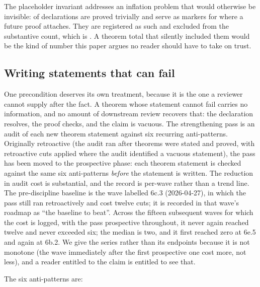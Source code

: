 \documentclass[11pt]{article}
\begin{document}
The placeholder invariant addresses an inflation problem that would
otherwise be invisible: \placeholdertheorems{} of \totaltheorems{}
declarations are proved trivially and serve as markers for where a future
proof attaches. They are registered as such and excluded from the
substantive count, which is \substantivetheorems{}. A theorem total that
silently included them would be the kind of number this paper argues no
reader should have to take on trust.


\subsection{Writing statements that can fail}
\label{sec:strengthening}

One precondition deserves its own treatment, because it is the one a
reviewer cannot supply after the fact. A theorem whose statement cannot
fail carries no information, and no amount of downstream review recovers
that: the declaration resolves, the proof checks, and the claim is
vacuous. The strengthening pass is an audit of each new theorem statement
against six recurring anti-patterns. Originally retroactive (the audit ran after
theorems were stated and proved, with retroactive cuts applied
where the audit identified a vacuous statement), the pass has
been moved to the prospective phase: each theorem statement is
checked against the same six anti-patterns \emph{before} the
statement is written. The reduction in audit cost is substantial, and
the record is per-wave rather than a trend line. The
pre-discipline baseline is the wave labelled 6c.3 (2026-04-27), in
which the pass still ran retroactively and cost twelve cuts; it is
recorded in that wave's roadmap as ``the baseline to beat''. Across
the fifteen subsequent waves for which the cost is logged, with the
pass prospective throughout, it never again reached twelve and never
exceeded six; the median is two, and it first reached zero at 6e.5 and
again at 6b.2. We give the series rather than its endpoints because it
is not monotone (the wave immediately after the first prospective
one cost more, not less), and a reader entitled to the claim is
entitled to see that.

The six anti-patterns are:
\end{document}
